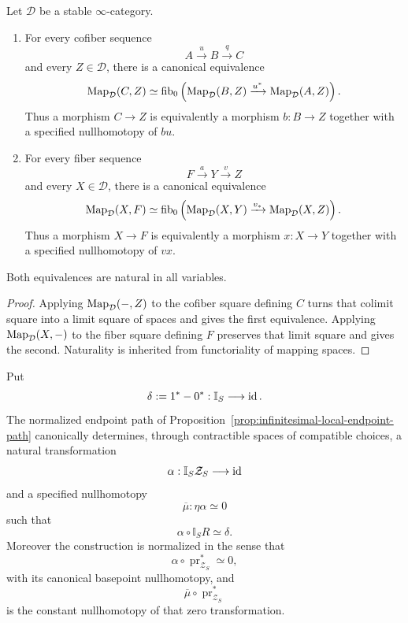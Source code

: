 \begin{lemma}
\label{lem:infinitesimal-bnv-mapping-fiber-cofiber}
Let $\mathcal D$ be a stable $\infty$-category.
\begin{enumerate}
\item For every cofiber sequence
\[
    A\xrightarrow{u}B\xrightarrow{q}C
\]
and every $Z\in\mathcal D$, there is a canonical equivalence
\[
    \operatorname{Map}_{\mathcal D}(C,Z)
    \simeq
    \operatorname{fib}_{0}
    \left(
      \operatorname{Map}_{\mathcal D}(B,Z)
      \xrightarrow{u^*}
      \operatorname{Map}_{\mathcal D}(A,Z)
    \right).
\]
Thus a morphism $C\to Z$ is equivalently a morphism $b:B\to Z$ together
with a specified nullhomotopy of $bu$.
\item For every fiber sequence
\[
    F\xrightarrow{a}Y\xrightarrow{v}Z
\]
and every $X\in\mathcal D$, there is a canonical equivalence
\[
    \operatorname{Map}_{\mathcal D}(X,F)
    \simeq
    \operatorname{fib}_{0}
    \left(
      \operatorname{Map}_{\mathcal D}(X,Y)
      \xrightarrow{v_*}
      \operatorname{Map}_{\mathcal D}(X,Z)
    \right).
\]
Thus a morphism $X\to F$ is equivalently a morphism $x:X\to Y$ together
with a specified nullhomotopy of $vx$.
\end{enumerate}
Both equivalences are natural in all variables.
\end{lemma}

\begin{proof}
Applying $\operatorname{Map}_{\mathcal D}(-,Z)$ to the cofiber square defining $C$ turns
that colimit square into a limit square of spaces and gives the first
equivalence.  Applying $\operatorname{Map}_{\mathcal D}(X,-)$ to the fiber square defining
$F$ preserves that limit square and gives the second.  Naturality is inherited
from functoriality of mapping spaces.
\end{proof}

\begin{lemma}
\label{lem:infinitesimal-bnv-normalized-factorization}
Put
\[
    \delta:=1^*-0^*:\mathbb I_S\longrightarrow\operatorname{id}.
\]
The normalized endpoint path of
Proposition~\ref{prop:infinitesimal-local-endpoint-path} canonically
determines, through contractible spaces of compatible choices, a natural
transformation
\[
    \alpha:
    \mathbb I_S\mathcal Z_S
    \longrightarrow
    \operatorname{id}
\]
and a specified nullhomotopy
\[
    \overline\mu:
    \eta\alpha\simeq0
\]
such that
\[
    \alpha\circ\mathbb I_SR
    \simeq
    \delta.
\]
Moreover the construction is normalized in the sense that
\[
    \alpha\circ\operatorname{pr}^*_{\mathcal Z_S}
    \simeq0,
\]
with its canonical basepoint nullhomotopy, and
\[
    \overline\mu\circ\operatorname{pr}^*_{\mathcal Z_S}
\]
is the constant nullhomotopy of that zero transformation.
\end{lemma}

